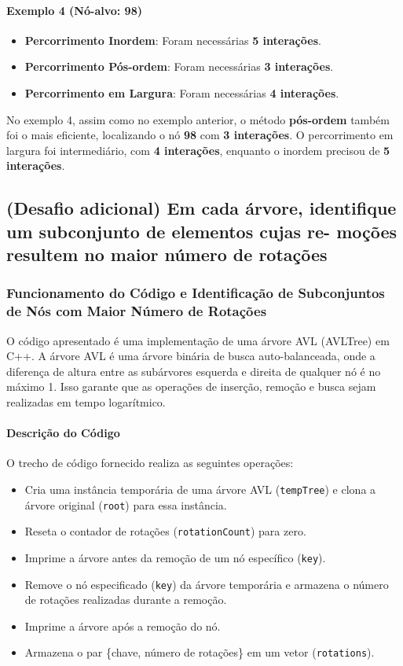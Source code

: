 \documentclass{article}
\begin{document}
\paragraph{Exemplo 4 (Nó-alvo: 98)}

\begin{itemize}
    \item \textbf{Percorrimento Inordem}: Foram necessárias \textbf{5 interações}.
    \item \textbf{Percorrimento Pós-ordem}: Foram necessárias \textbf{3 interações}.
    \item \textbf{Percorrimento em Largura}: Foram necessárias \textbf{4 interações}.
\end{itemize}

No exemplo 4, assim como no exemplo anterior, o método \textbf{pós-ordem} também foi o mais eficiente, localizando o nó \textbf{98} com \textbf{3 interações}. O percorrimento em largura foi intermediário, com \textbf{4 interações}, enquanto o inordem precisou de \textbf{5 interações}.

\subsection{(Desafio adicional) Em cada árvore, identifique um subconjunto de elementos cujas re-
moções resultem no maior número de rotações}

\subsubsection{Funcionamento do Código e Identificação de Subconjuntos de Nós com Maior Número de Rotações}

O código apresentado é uma implementação de uma árvore AVL (AVLTree) em C++. A árvore AVL é uma árvore binária de busca auto-balanceada, onde a diferença de altura entre as subárvores esquerda e direita de qualquer nó é no máximo 1. Isso garante que as operações de inserção, remoção e busca sejam realizadas em tempo logarítmico.

\paragraph{Descrição do Código}
O trecho de código fornecido realiza as seguintes operações:

\begin{itemize}
    \item Cria uma instância temporária de uma árvore AVL (\texttt{tempTree}) e clona a árvore original (\texttt{root}) para essa instância.
    \item Reseta o contador de rotações (\texttt{rotationCount}) para zero.
    \item Imprime a árvore antes da remoção de um nó específico (\texttt{key}).
    \item Remove o nó especificado (\texttt{key}) da árvore temporária e armazena o número de rotações realizadas durante a remoção.
    \item Imprime a árvore após a remoção do nó.
    \item Armazena o par \{chave, número de rotações\} em um vetor (\texttt{rotations}).
\end{itemize}
\end{document}
